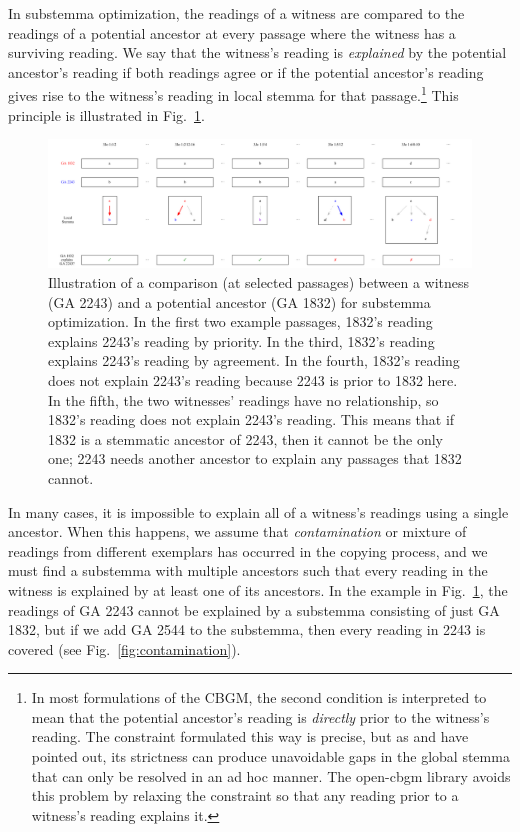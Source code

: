 \documentclass[a4paper, 12pt]{article}
\begin{document}
	In substemma optimization, the readings of a witness are compared to the readings of a potential ancestor at every passage where the witness has a surviving reading. We say that the witness's reading is \emph{explained} by the potential ancestor's reading if both readings agree or if the potential ancestor's reading gives rise to the witness's reading in local stemma for that passage.\footnote{In most formulations of the CBGM, the second condition is interpreted to mean that the potential ancestor's reading is \emph{directly} prior to the witness's reading. The constraint formulated this way is precise, but as \cite[59--63]{Mink04} and \cite[139--140]{Edmondson19} have pointed out, its strictness can produce unavoidable gaps in the global stemma that can only be resolved in an ad hoc manner. The \textsf{open-cbgm} library avoids this problem by relaxing the constraint so that any reading prior to a witness's reading explains it.} This principle is illustrated in Fig.~\ref{fig:explained-readings}.
	
	\begin{figure}
		\centering
		\includegraphics[width=\textwidth]{../graphics/explained-readings.pdf}
		\caption{Illustration of a comparison (at selected passages) between a witness (GA 2243) and a potential ancestor (GA 1832) for substemma optimization. In the first two example passages, 1832's reading explains 2243's reading by priority. In the third, 1832's reading explains 2243's reading by agreement. In the fourth, 1832's reading does not explain 2243's reading because 2243 is prior to 1832 here. In the fifth, the two witnesses' readings have no relationship, so 1832's reading does not explain 2243's reading. This means that if 1832 is a stemmatic ancestor of 2243, then it cannot be the only one; 2243 needs another ancestor to explain any passages that 1832 cannot.}
		\label{fig:explained-readings}
	\end{figure}
	
	\newpage
	
	In many cases, it is impossible to explain all of a witness's readings using a single ancestor. When this happens, we assume that \emph{contamination} or mixture of readings from different exemplars has occurred in the copying process, and we must find a substemma with multiple ancestors such that every reading in the witness is explained by at least one of its ancestors. In the example in Fig.~\ref{fig:explained-readings}, the readings of GA 2243 cannot be explained by a substemma consisting of just GA 1832, but if we add GA 2544 to the substemma, then every reading in 2243 is covered (see Fig.~\ref{fig:contamination}).
	
\end{document}
